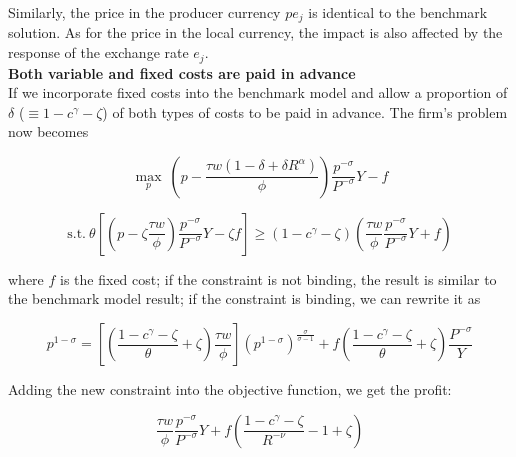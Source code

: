 Similarly, the price in the producer currency $pe_{j}$ is identical to the benchmark solution. As for the price in the local currency, the impact is also affected by the response of the exchange rate $e_j$. \\



\textbf{Both variable and fixed costs are paid in advance} \\

If we incorporate fixed costs into the benchmark model and allow a proportion of $\delta$ ($\equiv 1-c^{\gamma}-\zeta$) of both types of costs to be paid in advance. The firm's problem now becomes

$$
\max_{p} \ (p- \frac{\tau w(1-\delta+\delta R^\alpha)}{\phi}) \frac{p^{-\sigma}}{P^{-\sigma}} Y-f
$$

\begin{equation}
\text{s.t.} \ \theta [(p -\zeta \frac{\tau w}{\phi}) \frac{p^{-\sigma}}{P^{-\sigma}} Y -\zeta f ]\geq(1-c^\gamma-\zeta) (\frac{\tau w}{\phi} \frac{p^{-\sigma}}{P^{-\sigma}} Y+f)
\end{equation}

where $f$ is the fixed cost; if the constraint is not binding, the result is similar to the benchmark model result; if the constraint is binding, we can rewrite it as 

\begin{equation}\label{eq:constraint_fixedcost}
p^{1-\sigma}=[(\frac{1-c^{\gamma}-\zeta}{\theta}+\zeta)\frac{\tau w}{\phi}] (p^{1-\sigma})^{\frac{\sigma}{\sigma-1}}+f(\frac{1-c^{\gamma}-\zeta}{\theta}+\zeta)\frac{P^{-\sigma}}{Y}
\end{equation}

Adding the new constraint into the objective function, we get the profit: 

\begin{equation}
[\frac{1-c^\gamma-\zeta}{R^{-\nu}}-c^\gamma-(1-c^\gamma-\zeta)R^{\alpha}]\frac{\tau w}{\phi} \frac{p^{-\sigma}}{P^{-\sigma}}Y+f(\frac{1-c^\gamma-\zeta}{R^{-\nu}}-1+\zeta)
\end{equation}


